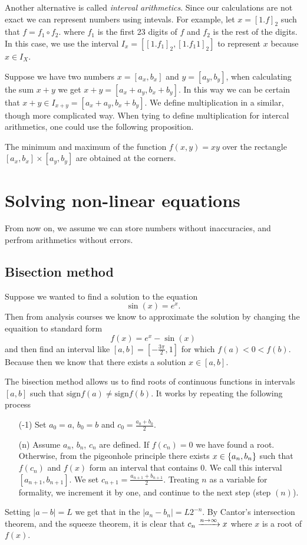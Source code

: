 \documentclass[11pt,a4paper]{article}
\begin{document}
Another alternative is called \emph{interval arithmetics}.
Since our calculations are not exact we can represent numbers using intevals.
For example, let $x = [1.f]_2$ such that $f = f_1 \circ f_2$.
where $f_1$ is the first 23 digits of $f$ and $f_2$ is the rest of the digits.
In this case, we use the interval $I_x = [[1.f_1]_2,[1.f_1 1]_2]$ to represent
$x$ because $x \in I_X$.

Suppose we have two numbers $x = [a_x, b_x]$ and $y = [a_y, b_y]$, when
calculating the sum $x + y$ we get $x + y = [a_x + a_y, b_x + b_y]$.
In this way we can be certain that
$x + y \in I_{x+y} = [a_x + a_y, b_x + b_y]$.
We define multiplication in a similar, though more complicated way.
When tying to define multiplication for intercal arithmetics, one could
use the following proposition.

\begin{proposition}
  The minimum and maximum of the function $f(x, y) = xy$ over
  the rectangle $[a_x, b_x] \times [a_y, b_y]$ are obtained at the corners. 
\end{proposition}

\section{Solving non-linear equations}
From now on, we assume we can store numbers without inaccuracies, and
perfrom arithmetics without errors.

\subsection{Bisection method}
Suppose we wanted to find a solution to the equation
\[
  \sin(x) = e^x.
\]
Then from analysis courses we know to approximate the solution by changing
the equaition to standard form
\[
  f(x) = e^x - \sin(x)
\]
and then find an interval like $[a, b] = [-\frac{3 \pi}{2}, 1]$ for which
$f(a) < 0 < f(b)$.
Because then we know that there exists a solution $x \in [a,b]$.

The bisection method allows us to find roots of continuous functions in
intervals $[a,b]$ such that $\mathrm{sign} f(a) \neq \mathrm{sign} f(b)$.
It works by repeating the following process
\begin{enumerate}
  \item[(-1)] Set $a_0 = a$, $b_0 = b$ and $c_0 = \frac{a_0 + b_0}{2}$.
  \item[(n)] Assume $a_n$, $b_n$, $c_n$ are defined. If $f(c_n) = 0$
    we have found a root. Otherwise, from the pigeonhole principle there
    exists $x \in \set{a_n,b_n}$ such that $f(c_n)$ and $f(x)$ form an interval
    that contains $0$. We call this interval $[a_{n + 1}, b_{n + 1}]$.
    We set $c_{n + 1} = \frac{a_{n + 1} + b_{n + 1}}{2}$. Treating $n$
    as a variable for formality, we increment it by one, and continue to
    the next step (step $(n)$).
\end{enumerate}
Setting $|a - b| = L$ we get that in the $|a_n - b_n| = L 2^{-n}$.
By Cantor's intersection theorem, and the squeeze theorem, it is clear
that $c_n \xrightarrow{n \to \infty} x$ where $x$ is a root of $f(x)$.
\end{document}
